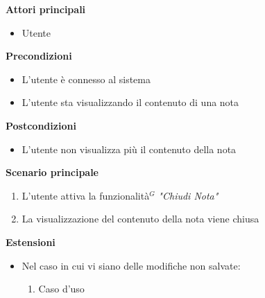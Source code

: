 \documentclass[a4paper,10pt]{article}
\begin{document}
    \textbf{Attori principali}
    \begin{itemize}
        \item Utente
    \end{itemize}
    \textbf{Precondizioni}
    \begin{itemize}
        \item L'utente è connesso al sistema
        \item L'utente sta visualizzando il contenuto di una nota
    \end{itemize}
    \textbf{Postcondizioni}
    \begin{itemize}
        \item L'utente non visualizza più il contenuto della nota
    \end{itemize}
    \textbf{Scenario principale}
    \begin{enumerate}
        \item L'utente attiva la funzionalità$^G$ \textit{"Chiudi Nota"}
        \item La visualizzazione del contenuto della nota viene chiusa
    \end{enumerate}
    \textbf{Estensioni}
    \begin{itemize}
        \item Nel caso in cui vi siano delle modifiche non salvate:
        \begin{enumerate}
            \item Caso d'uso 
        \end{enumerate}
    \end{itemize}
\end{document}
